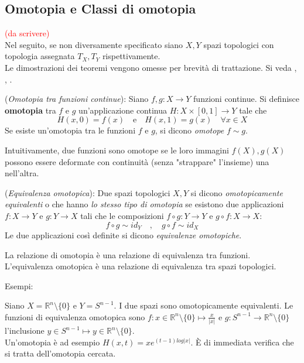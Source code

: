 \subsection{Omotopia e Classi di omotopia}
\textcolor{red}{(da scrivere)}\\
Nel seguito, se non diversamente specificato siano $X,Y$ spazi topologici con
topologia assegnata $T_X , T_Y$ rispettivamente. \\
Le dimostrazioni dei teoremi vengono omesse per brevità di trattazione. Si veda
\cite{sernesi}, \cite{fulton}, \cite{nakahara}.

\begin{definition}(\emph{Omotopia tra funzioni continue}):
   Siano $f,g : X \to Y$ funzioni continue. Si definisce \textbf{omotopia} tra
   $f$ e $g$ un'applicazione continua $H : X \times [0,1] \to Y$ tale che
   $$ H(x,0) = f(x) \quad \mathrm{e} \quad H(x,1) = g(x) \quad \forall x \in X$$
   Se esiste un'omotopia tra le funzioni $f$ e $g$, si dicono \emph{omotope} $f \sim g$.
   \label{def:omotopia}
\end{definition}

Intuitivamente, due funzioni sono omotope se le loro immagini $f(X),g(X)$ possono essere
deformate con continuità (senza "strappare" l'insieme) una nell'altra.

\begin{definition}(\emph{Equivalenza omotopica}):
   Due spazi topologici $X,Y$ si dicono \emph{omotopicamente equivalenti} o che hanno
   \emph{lo stesso tipo di omotopia} se esistono due applicazioni $f : X \to Y$ e
   $g : Y \to X$ tali che le composizioni $f \circ g : Y \to Y$ e
   $g \circ f : X \to X$:
      $$  f \circ g \sim id_Y \quad , \quad g \circ f \sim id_X $$
   Le due applicazioni così definite si dicono \emph{equivalenze omotopiche}.
\end{definition}

\begin{lemma}
   La relazione di omotopia è una relazione di equivalenza tra funzioni.
   L'equivalenza omotopica è una relazione di equivalenza tra spazi topologici.
\end{lemma}

Esempi:
\begin{example}
   Siano $X = \mathbb{R}^n\setminus\{0\}$ e $Y = S^{n-1}$. I due spazi sono
   omotopicamente equivalenti. Le funzioni di equivalenza omotopica sono
   $f : x \in \mathbb{R}^n\setminus\{0\} \mapsto \frac{x}{|x|}$ e
   $g : S^{n-1} \to \mathbb{R}^n\setminus\{0\}$ l'inclusione
   $y \in S^{n-1} \mapsto y \in \mathbb{R}^n\setminus\{0\}$. \\
   Un'omotopia è ad esempio $H(x,t) = x e^{(t-1)log|x|}$. È di immediata verifica
   che si tratta dell'omotopia cercata.
\end{example}

